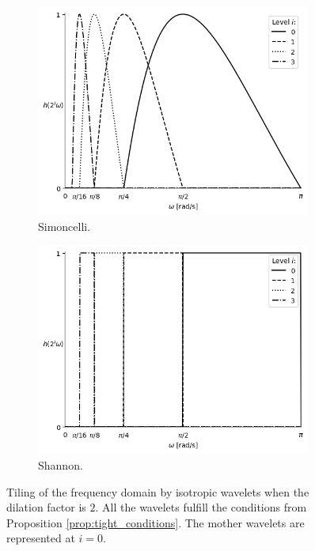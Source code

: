 \begin{figure}[H]
\begin{subfigure}[t]{.49\textwidth}
  \end{subfigure}
  \vspace*{\floatsep}
  \begin{subfigure}[t]{.49\textwidth}
    \centering
    \includegraphics[width=0.99\textwidth]{Figures/chapter-wavelets/figures/profileMotherWavelet_Simoncelli_5_Mother.png}
    \captionsetup{width=\textwidth}
    \caption{Simoncelli.}
    \label{fig:mother_simoncelli}
  \end{subfigure}
  \begin{subfigure}[t]{.49\textwidth}
    \centering
    \includegraphics[width=0.99\textwidth]{Figures/chapter-wavelets/figures/profileMotherWavelet_Shannon_5_Mother.png}
    \captionsetup{width=\textwidth}
    \caption{Shannon.}
    \label{fig:mother_shannon}
  \end{subfigure}
  \caption{Tiling of the frequency domain by isotropic wavelets when the dilation factor is $2$. All the wavelets fulfill the conditions from Proposition \ref{prop:tight_conditions}. The mother wavelets are represented at $i=0$. }
  \label{fig:mother_wavelets}
\end{figure}
